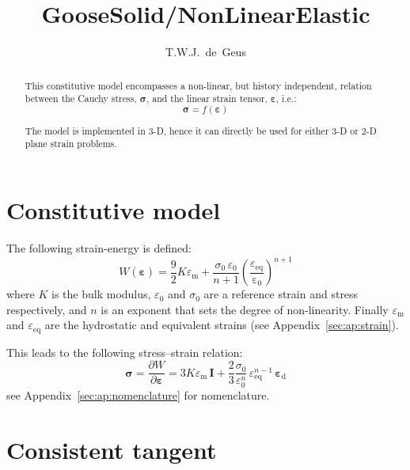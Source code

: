 \documentclass[times,namecite]{goose-article}
\title{%
  GooseSolid/NonLinearElastic
}
\author{T.W.J.~de~Geus}
\begin{document}
\maketitle

\begin{abstract}
This constitutive model encompasses a non-linear, but history independent, relation between the Cauchy stress, $\bm{\sigma}$, and the linear strain tensor, $\bm{\varepsilon}$, i.e.:
\begin{equation*}
  \bm{\sigma} = f \left( \bm{\varepsilon} \right)
\end{equation*}

The model is implemented in 3-D, hence it can directly be used for either 3-D or 2-D plane strain problems.
\end{abstract}


\setcounter{tocdepth}{2}
\tableofcontents

\vfill\newpage
\section{Constitutive model}

The following strain-energy is defined:
%
\begin{equation}
  W ( \bm{\varepsilon} )
  = \frac{9}{2} K \varepsilon_\mathrm{m}
  + \frac{ \sigma_0 \, \varepsilon_0 }{ n+1 }
    \left( \frac{\varepsilon_\mathrm{eq}}{\mathrm{\varepsilon_0}} \right)^{n+1}
\end{equation}
%
where $K$ is the bulk modulus, $\varepsilon_0$ and $\sigma_0$ are a reference strain and stress respectively, and $n$ is an exponent that sets the degree of non-linearity. Finally $\varepsilon_\mathrm{m}$ and $\varepsilon_\mathrm{eq}$ are the hydrostatic and equivalent strains (see Appendix~\ref{sec:ap:strain}).

This leads to the following stress--strain relation:
%
\begin{equation}
\label{eq:stress}
  \bm{\sigma}
  = \frac{\partial W}{\partial \bm{\varepsilon}}
  = 3 K \varepsilon_\mathrm{m} \, \bm{I}
  + \frac{2}{3} \frac{\sigma_0}{\varepsilon_0^n} \,
    \varepsilon_\mathrm{eq}^{n-1} \, \bm{\varepsilon}_\mathrm{d}
\end{equation}
%
see Appendix~\ref{sec:ap:nomenclature} for nomenclature.

\section{Consistent tangent}
\end{document}
